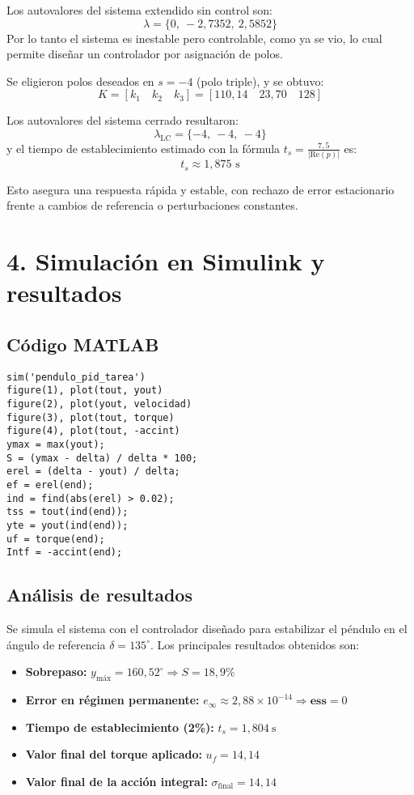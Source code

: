 \documentclass[11pt]{article}
\begin{document}
Los autovalores del sistema extendido sin control son:
\[
\lambda = \{0,\ -2{,}7352,\ 2{,}5852\}
\]
Por lo tanto el sistema es inestable pero controlable, como ya se vio, lo cual permite diseñar un controlador por asignación de polos.

Se eligieron polos deseados en \( s = -4 \) (polo triple), y se obtuvo:
\[
K = [k_1 \quad k_2 \quad k_3] = [110{,}14 \quad 23{,}70 \quad 128]
\]

Los autovalores del sistema cerrado resultaron:
\[
\lambda_{\text{LC}} = \{-4,\ -4,\ -4\}
\]
y el tiempo de establecimiento estimado con la fórmula \( t_s = \frac{7{,}5}{|\text{Re}(p)|} \) es:
\[
t_s \approx 1{,}875 \text{ s}
\]

Esto asegura una respuesta rápida y estable, con rechazo de error estacionario frente a cambios de referencia o perturbaciones constantes.

\section*{4. Simulación en Simulink y resultados}
\subsection*{Código MATLAB}
\begin{lstlisting}
sim('pendulo_pid_tarea')
figure(1), plot(tout, yout)
figure(2), plot(yout, velocidad)
figure(3), plot(tout, torque)
figure(4), plot(tout, -accint)
ymax = max(yout);
S = (ymax - delta) / delta * 100;
erel = (delta - yout) / delta;
ef = erel(end);
ind = find(abs(erel) > 0.02);
tss = tout(ind(end));
yte = yout(ind(end));
uf = torque(end);
Intf = -accint(end);
\end{lstlisting}

\subsection*{Análisis de resultados}

Se simula el sistema con el controlador diseñado para estabilizar el péndulo en el ángulo de referencia \( \delta = 135^\circ \). Los principales resultados obtenidos son:

\begin{itemize}
  \item \textbf{Sobrepaso:} \( y_{\text{máx}} = 160{,}52^\circ \Rightarrow S = 18{,}9\% \)
  \item \textbf{Error en régimen permanente:} \( e_{\infty} \approx 2{,}88 \times 10^{-14} \Rightarrow \textbf{ess} = 0 \)
  \item \textbf{Tiempo de establecimiento (2\%):} \( t_s = 1{,}804 \ \text{s} \)
  \item \textbf{Valor final del torque aplicado:} \( u_f = 14{,}14 \)
  \item \textbf{Valor final de la acción integral:} \( \sigma_{\text{final}} = 14{,}14 \)
\end{itemize}
\end{document}
